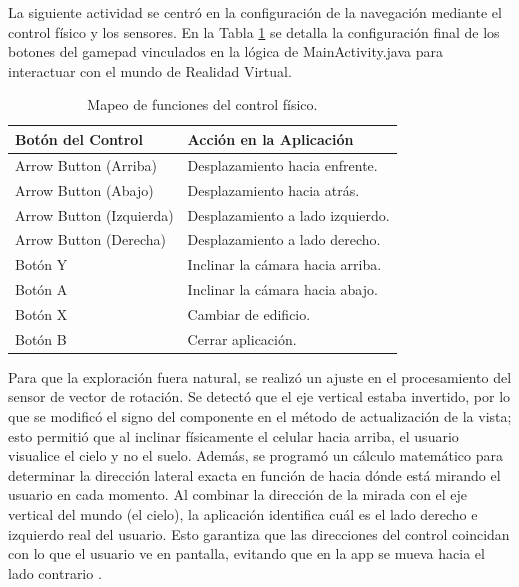 \documentclass[conference]{IEEEtran}
\begin{document}
\vspace{0.7cm}

La siguiente actividad se centró en la configuración de la navegación mediante el control físico y los sensores. En la Tabla \ref{Tab:Control} se detalla la configuración final de los botones del gamepad vinculados en la lógica de MainActivity.java para interactuar con el mundo de Realidad Virtual.

\begin{table}[h!]
	\centering
	\renewcommand{\arraystretch}{1.3}
	\caption{Mapeo de funciones del control físico.}
	\label{Tab:Control}
	\begin{tabular}{|l|l|}
		\hline
		\textbf{Botón del Control} & \textbf{Acción en la Aplicación} \\ \hline
		Arrow Button (Arriba)          & Desplazamiento hacia enfrente. \\ \hline
		Arrow Button (Abajo)          & Desplazamiento hacia atrás. \\ \hline
		Arrow Button (Izquierda)           & Desplazamiento a lado izquierdo. \\ \hline
		Arrow Button (Derecha)        & Desplazamiento a lado derecho. \\ \hline
		Botón Y                    & Inclinar la cámara hacia arriba. \\ \hline
		Botón A                    & Inclinar la cámara hacia abajo. \\ \hline
		Botón X                    & Cambiar de edificio. \\ \hline
		Botón B                    & Cerrar aplicación. \\ \hline
	\end{tabular}
\end{table}

\vspace{0.2cm}

Para que la exploración fuera natural, se realizó un ajuste en el procesamiento del sensor de vector de rotación. Se detectó que el eje vertical estaba invertido, por lo que se modificó el signo del componente en el método de actualización de la vista; esto permitió que al inclinar físicamente el celular hacia arriba, el usuario visualice el cielo y no el suelo. Además, se programó un cálculo matemático para determinar la dirección lateral exacta en función de hacia dónde está mirando el usuario en cada momento. Al combinar la dirección de la mirada con el eje vertical del mundo (el cielo), la aplicación identifica cuál es el lado derecho e izquierdo real del usuario. Esto garantiza que las direcciones del control coincidan con lo que el usuario ve en pantalla, evitando que en la app se mueva hacia el lado contrario \cite{Dunn2011}.
\end{document}
